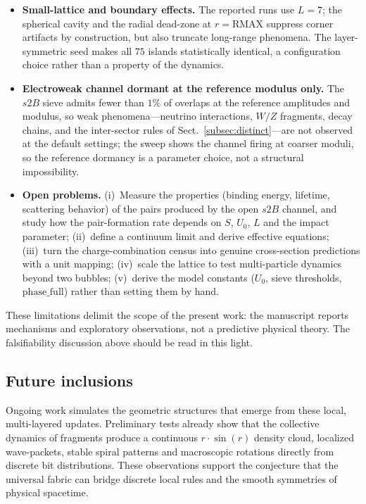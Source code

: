 \documentclass{ijuc}
\begin{document}
\begin{itemize}
\item \textbf{Small-lattice and boundary effects.}  The reported runs use $L=7$; the spherical cavity and the radial dead-zone at $r=\mathrm{RMAX}$ suppress corner artifacts by construction, but also truncate long-range phenomena.  The layer-symmetric seed makes all $75$ islands statistically identical, a configuration choice rather than a property of the dynamics.
\item \textbf{Electroweak channel dormant at the reference modulus only.}  The $s2B$ sieve admits fewer than $1\%$ of overlaps at the reference amplitudes and modulus, so weak phenomena---neutrino interactions, $W/Z$ fragments, decay chains, and the inter-sector rules of Sect.~\ref{subsec:distinct}---are not observed at the default settings; the sweep shows the channel firing at coarser moduli, so the reference dormancy is a parameter choice, not a structural impossibility.
\item \textbf{Open problems.}  (i)~Measure the properties (binding energy, lifetime, scattering behavior) of the pairs produced by the open $s2B$ channel, and study how the pair-formation rate depends on $S$, $U_0$, $L$ and the impact parameter; (ii)~define a continuum limit and derive effective equations; (iii)~turn the charge-combination census into genuine cross-section predictions with a unit mapping; (iv)~scale the lattice to test multi-particle dynamics beyond two bubbles; (v)~derive the model constants ($U_{0}$, sieve thresholds, $\mathrm{phase\_full}$) rather than setting them by hand.
\end{itemize}
These limitations delimit the scope of the present work: the manuscript reports mechanisms and exploratory observations, not a predictive physical theory.  The falsifiability discussion above should be read in this light.
\subsection{Future inclusions}
Ongoing work simulates the geometric structures that emerge from these local, multi-layered updates. Preliminary tests already show that the collective dynamics of fragments produce a continuous $r \cdot \sin(r)$ density cloud, localized wave-packets, stable spiral patterns and macroscopic rotations directly from discrete bit distributions. These observations support the conjecture that the universal fabric can bridge discrete local rules and the smooth symmetries of physical spacetime.
\end{document}
